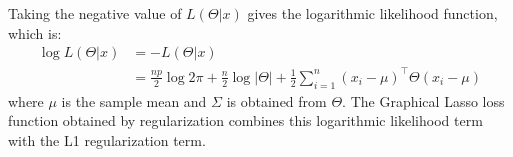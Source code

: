 Taking the negative value of \(L(\Theta|x)\) gives the logarithmic likelihood function, which is:
\begin{equation*}
	\begin{aligned}
		\log L(\Theta|x) & =-L(\Theta|x)                                                                                                   \\
		                 & =\frac{np}{2} \log2\pi +\frac{n}{2} \log |\Theta| +\frac{1}{2} \sum_{i=1}^{n} (x_i-\mu)^{\top} \Theta (x_i-\mu)
	\end{aligned}
\end{equation*}
where \(\mu\) is the sample mean and \(\Sigma\) is obtained from \(\Theta\). The Graphical Lasso loss function obtained by regularization combines this logarithmic likelihood term with the L1 regularization term.
